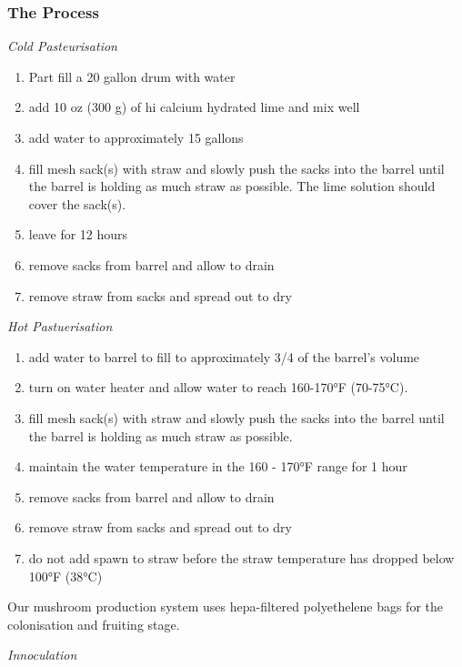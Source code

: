 \subsubsection{The Process}\label{the-process}

\emph{Cold Pasteurisation}

\begin{enumerate}
\def\labelenumi{\arabic{enumi}.}
\itemsep1pt\parskip0pt
\item
  Part fill a 20 gallon drum with water
\item
  add 10 oz (300 g) of hi calcium hydrated lime and mix well
\item
  add water to approximately 15 gallons
\item
  fill mesh sack(s) with straw and slowly push the sacks into the barrel
  until the barrel is holding as much straw as possible. The lime
  solution should cover the sack(s).
\item
  leave for 12 hours
\item
  remove sacks from barrel and allow to drain
\item
  remove straw from sacks and spread out to dry
\end{enumerate}

\emph{Hot Pastuerisation}

\begin{enumerate}
\def\labelenumi{\arabic{enumi}.}
\itemsep1pt\parskip0pt
\item
  add water to barrel to fill to approximately 3/4 of the barrel's
  volume
\item
  turn on water heater and allow water to reach 160-170°F (70-75°C).
\item
  fill mesh sack(s) with straw and slowly push the sacks into the barrel
  until the barrel is holding as much straw as possible.
\item
  maintain the water temperature in the 160 - 170°F range for 1 hour
\item
  remove sacks from barrel and allow to drain
\item
  remove straw from sacks and spread out to dry
\item
  do not add spawn to straw before the straw temperature has dropped
  below 100°F (38°C)
\end{enumerate}

Our mushroom production system uses hepa-filtered polyethelene bags for
the colonisation and fruiting stage.

\emph{Innoculation}

